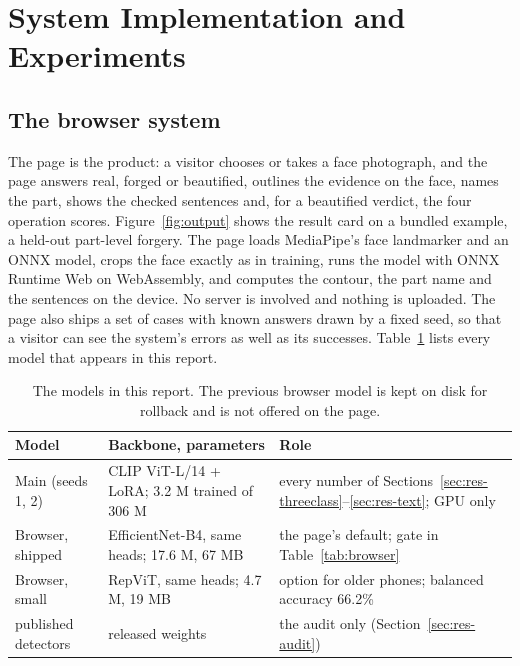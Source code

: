 \documentclass[conference,a4paper]{IEEEtran}
\begin{document}
\section{System Implementation and Experiments}

\subsection{The browser system}
\label{sec:system}

The page is the product: a visitor chooses or takes a face photograph, and the page answers real, forged or beautified,
outlines the evidence on the face, names the part, shows the checked sentences and, for a beautified verdict, the four
operation scores. Figure~\ref{fig:output} shows the result card on a bundled example, a held-out part-level forgery. The page loads MediaPipe's face landmarker and an ONNX
model, crops the face exactly as in training, runs the model with ONNX Runtime Web on WebAssembly, and computes the contour,
the part name and the sentences on the device. No server is involved and nothing is uploaded. The page also ships a set of
cases with known answers drawn by a fixed seed, so that a visitor can see the system's errors as well as its successes.
Table~\ref{tab:models} lists every model that appears in this report.

\begin{table}[!htb]
\centering
\caption{The models in this report. The previous browser model is kept on disk for rollback and is not offered on the page.}
\label{tab:models}
\footnotesize
\setlength{\tabcolsep}{3pt}
\begin{tabularx}{\columnwidth}{@{}>{\raggedright\arraybackslash}p{2.0cm}>{\raggedright\arraybackslash}p{2.75cm}>{\raggedright\arraybackslash}X@{}}
\toprule
Model & Backbone, parameters & Role \\
\midrule
Main (seeds 1, 2) & CLIP ViT-L/14 + LoRA; 3.2 M trained of 306 M & every number of Sections~\ref{sec:res-threeclass}--\ref{sec:res-text}; GPU only \\
Browser, shipped & EfficientNet-B4, same heads; 17.6 M, 67 MB & the page's default; gate in Table~\ref{tab:browser} \\
Browser, small & RepViT, same heads; 4.7 M, 19 MB & option for older phones; balanced accuracy 66.2\% \\
17 published detectors & released weights & the audit only (Section~\ref{sec:res-audit}) \\
\bottomrule
\end{tabularx}
\end{table}
\end{document}
